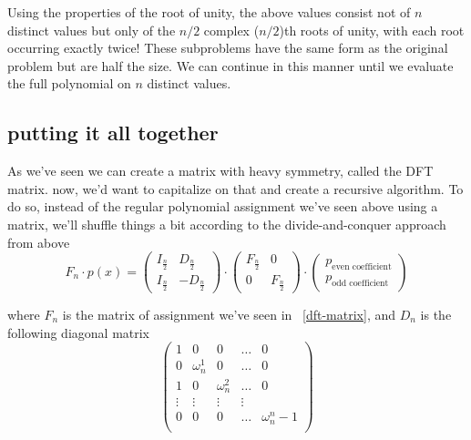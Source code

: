 Using the properties of the root of unity, 
the above values consist not of $n$ distinct values but only of the $n/2$
 complex ($n/2$)th roots of unity, with each root occurring exactly twice!
These subproblems have the same form as the original problem but are half the size.
We can continue in this manner until we evaluate the full polynomial on $n$ distinct values.


\subsection{putting it all together}
As we've seen we can create a matrix with heavy symmetry, called the DFT matrix. 
now, we'd want to capitalize on that and create a recursive algorithm.
To do so, instead of the regular polynomial assignment we've seen above using a matrix,  
we'll shuffle things a bit according to the divide-and-conquer approach from above
$$
F_n \cdot p(x) = 
\begin{pmatrix}
  I_{ \frac{n}{2}} & D_{\frac{n}{2}} \\
  I_{ \frac{n}{2}} & -D_{\frac{n}{2}}
 \end{pmatrix}
 \cdot 
 \begin{pmatrix}
  F_{ \frac{n}{2}} & 0 \\
  0 & F_{ \frac{n}{2}} 
\end{pmatrix}
\cdot 
\begin{pmatrix}
  p_{\text{even coefficient}} \\
  p_{\text{odd coefficient}}
\end{pmatrix}
 $$

 where $F_n$ is the matrix of assignment we've seen in ~\ref{dft-matrix}, and 
 $D_n$ is the following diagonal matrix $$
 \begin{pmatrix}
  1 & 0 &0  & \dots& 0 \\
  0 & \omega_n^1 &0  & \dots& 0 \\
  1 & 0  &\omega_n^2  & \dots& 0 \\
  \vdots & \vdots & \vdots & \vdots &  \\
  0 & 0  &0  & \dots& \omega_n^n-1 \\
 \end{pmatrix} $$


